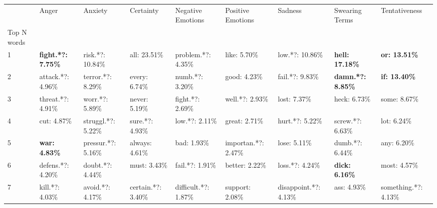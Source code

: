 \begin{table}[h]\centering
\begin{adjustbox}{width=\linewidth, center}
	\begin{tabular}{lllllllll}
	\toprule
	{} &                      Anger &               Anxiety &              Certainty &     Negative Emotions &    Positive Emotions &                Sadness &            Swearing Terms &         Tentativeness \\
	Top N words          &                            &                       &                        &                       &                      &                        &                           &                       \\
	\midrule
	1                    &  \textbf{fight.*?: 7.75\%} &      risk.*?: 10.84\% &           all: 23.51\% &    problem.*?: 4.35\% &         like: 5.70\% &        low.*?: 10.86\% &    \textbf{hell: 17.18\%} &  \textbf{or: 13.51\%} \\
	2                    &          attack.*?: 4.96\% &     terror.*?: 8.29\% &          every: 6.74\% &       numb.*?: 3.20\% &         good: 4.23\% &        fail.*?: 9.83\% &  \textbf{damn.*?: 8.85\%} &  \textbf{if: 13.40\%} \\
	3                    &          threat.*?: 4.91\% &       worr.*?: 5.89\% &          never: 5.19\% &      fight.*?: 2.69\% &      well.*?: 2.93\% &           lost: 7.37\% &              heck: 6.73\% &          some: 8.67\% \\
	4                    &                cut: 4.87\% &    struggl.*?: 5.22\% &        sure.*?: 4.93\% &        low.*?: 2.11\% &        great: 2.71\% &        hurt.*?: 5.22\% &          screw.*?: 6.63\% &           lot: 6.24\% \\
	5                    &       \textbf{war: 4.83\%} &    pressur.*?: 5.16\% &         always: 4.61\% &           bad: 1.93\% &  importan.*?: 2.47\% &           lose: 5.11\% &           dumb.*?: 6.44\% &           any: 6.20\% \\
	6                    &          defens.*?: 4.20\% &      doubt.*?: 4.44\% &           must: 3.43\% &       fail.*?: 1.91\% &       better: 2.22\% &        loss.*?: 4.24\% &     \textbf{dick: 6.16\%} &          most: 4.57\% \\
	7                    &            kill.*?: 4.03\% &      avoid.*?: 4.17\% &     certain.*?: 3.40\% &  difficult.*?: 1.87\% &      support: 2.08\% &  disappoint.*?: 4.13\% &               ass: 4.93\% &  something.*?: 4.13\% \\

\end{tabular}
\end{adjustbox}
\end{table}
